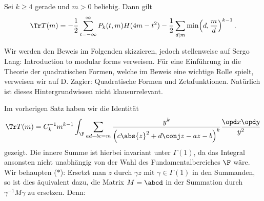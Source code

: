 \begin{theorem}
	Sei $k \geq 4$ gerade und $m > 0$ beliebig. Dann gilt
	\[
		\Tr T(m) = -\frac{1}{2} \sum_{t=-\infty}^\infty P_k(t,m) H(4m-t^2) - \frac{1}{2} \sum_{d|m} \min\Bigl(d, \frac{m}{d}\Bigr)^{k-1}\,.
	\]
\end{theorem}

\begin{bewe}
	Wir werden den Beweis im Folgenden skizzieren, jedoch stellenweise auf Sergo Lang: \glqq{}Introduction to modular forms\grqq{} verweisen. Für eine Einführung in die Theorie der quadratischen Formen, welche im Beweis eine wichtige Rolle spielt, verweisen wir auf D. Zagier: \glqq{}Quadratische Formen und Zetafunktionen\grqq{}. Natürlich ist dieses Hintergrundwissen nicht klausurrelevant.

Im vorherigen Satz haben wir die Identität
\[
	\Tr T(m) = C_k^{-1} m^{k-1} \int_{\F} \sum_{ad-bc = m} \frac{y^k}{\left(c \abs{z}^2 + d \conj z - az - b\right)^k} \frac{\opd x \opd y}{y^2}
\]
gezeigt. Die innere Summe ist hierbei invariant unter $\Gamma(1)$, da das Integral ansonsten nicht unabhängig von der Wahl des Fundamentalbereiches $\F$ wäre. Wir behaupten ($\ast$): Ersetzt man $z$ durch $\gamma z$ mit $\gamma \in \Gamma(1)$ in den Summanden, so ist dies äquivalent dazu, die Matrix $M = \abcd$ in der Summation durch $\gamma^{-1} M \gamma$ zu ersetzen. Denn: 


\end{bewe}
